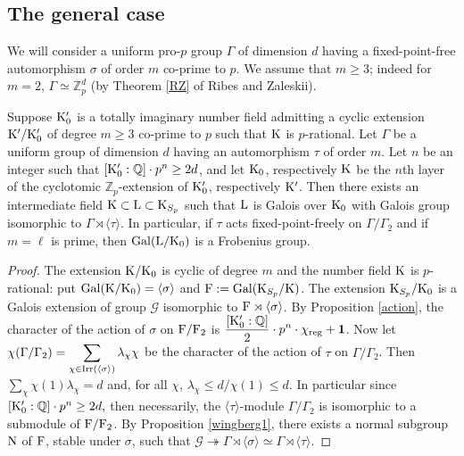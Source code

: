 \documentclass[12pt,a4paper,twoside,english]{smfart}
\def\K{{\rm K}}
\def\L{{\rm L}}
\def\F{{\rm F}}
\def\Q{{\mathbb Q}}
\def\Z{{\mathbb Z}}
\def\N{{\rm N}}
\def\G{{\mathcal G}}
\def\Irr{{\rm Irr}}
\def\Gal{{\rm Gal}}
\def\1{{\bf 1}}
\begin{document}
 \subsection{The general case} \label{cadregeneral} 
 

We will consider a uniform  pro-$p$ group $\Gamma$  of dimension $d$  having a fixed-point-free automorphism 
 $\sigma$ of order $m$ co-prime to $p$.   
 We assume that  $m \geq 3$; indeed for $m=2$, $\Gamma \simeq \Z_p^d$ (by Theorem \ref{RZ} of Ribes and Zaleskii).


\begin{prop}\label{existence}
Suppose $\K_0'$ is a totally imaginary number field admitting 
 a cyclic extension $\K'/\K_0'$ of degree $m \geq 3$ co-prime to $p$ such that
 $\K$ is $p$-rational.
Let $\Gamma$ be a uniform group of dimension $d$ having an automorphism $\tau$ of order $m$. Let
$n$ be an integer such that $[\K_0':\Q] \cdot p^n \geq 2d$, and let $\K_0$, respectively
$\K$ be the $n$th layer of the cyclotomic $\Z_p$-extension of $\K_0'$, respectively $\K'$.
Then there exists an intermediate field $\K \subset \L \subset \K_{S_p}$  such that
$\L$ is Galois over $\K_0$ with Galois group isomorphic to $\Gamma \rtimes \langle \tau \rangle$. In particular, if $\tau$ acts fixed-point-freely on $\Gamma/\Gamma_2$ and if $m=\ell$ is prime, then $\Gal(\L/\K_0)$ is a Frobenius group.
\end{prop}

\begin{proof}
The extension $\K/\K_0$ is cyclic of degree $m$ and the number field $\K$ is $p$-rational: put $\Gal(\K/\K_0)=\langle \sigma \rangle$ and $\F:=\Gal(\K_{S_p}/\K)$. The extension $\K_{S_p}/\K_0$ is a Galois extension of group $\G$ isomorphic to $\F\rtimes \langle \sigma \rangle $.
By Proposition \ref{action}, the character of the action of $\sigma$ on $\F/\F_2$ is $\displaystyle{\frac{[\K_0':\Q]}{2} \cdot p^n  \cdot \chi_{\mathrm{reg}}+\1}$.
Now let  $\displaystyle{\chi(\Gamma/\Gamma_2)=\sum_{\chi \in \Irr(\langle \sigma \rangle)}\lambda_\chi \chi}$ be the character of the action of $\tau$ on $\Gamma/\Gamma_2$. Then $\sum_\chi \chi(1) \lambda_\chi =d$ and, for all $\chi$,  $\lambda_\chi \leq d/\chi(1) \leq d$. In particular since $[\K_0':\Q] \cdot p^n \geq 2 d,$
then necessarily, the  $\langle \tau \rangle$-module $\Gamma/\Gamma_2$ is isomorphic to a submodule of $\F/\F_2$.  
 By Proposition \ref{wingberg1}, there exists a normal subgroup $\N$ of $\F$, stable under $\sigma$, such that $\G \twoheadrightarrow \Gamma \rtimes \langle \sigma \rangle \simeq \Gamma \rtimes \langle \tau \rangle$.
\end{proof}
\end{document}
